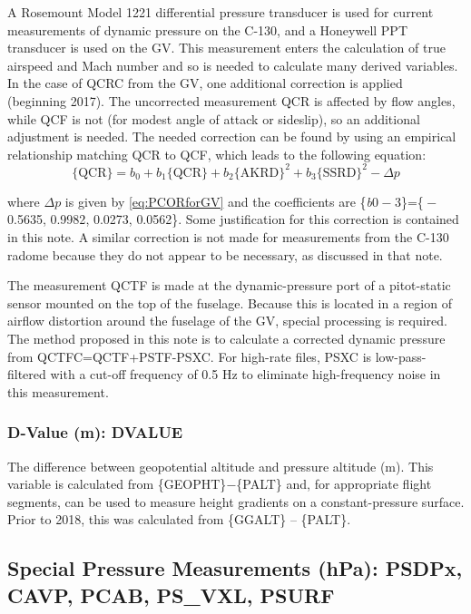 \documentclass[
]{book}
\begin{document}
A Rosemount Model 1221 differential pressure transducer is used for current measurements of dynamic pressure on the C-130, and a Honeywell PPT transducer is used on the GV. This measurement enters the calculation of true airspeed and Mach number and so is needed to calculate many derived variables.
In the case of QCRC from the GV, one additional correction is applied (beginning 2017). The uncorrected measurement QCR is affected by flow angles, while QCF is not (for modest angle of attack or sideslip), so an additional adjustment is needed. The needed correction can be found by using an empirical relationship matching QCR to QCF, which leads to the following equation:\\
\begin{equation}
\mathrm{\{QCR\}}=b_0+b_1\mathrm{\{QCR\}}+b_2\mathrm{\{AKRD\}}^2+b_3\mathrm{\{SSRD\}}^2-\Delta p
\label{eq:PCORforQCR}
\end{equation}

where \(\Delta p\) is given by \eqref{eq:PCORforGV} and the coefficients are \{{\emph{b}0 − 3}\}=\{{ − 0.5635}, {0.9982}, 0.0273, {0.0562}\}. Some justification for this correction is contained in this note. A similar correction is not made for measurements from the C-130 radome because they do not appear to be necessary, as discussed in that note.

The measurement QCTF is made at the dynamic-pressure port of a pitot-static sensor mounted on the top of the fuselage. Because this is located in a region of airflow distortion around the fuselage of the GV, special processing is required. The method proposed in this note is to calculate a corrected dynamic pressure from QCTFC=QCTF+PSTF-PSXC. For high-rate files, PSXC is low-pass-filtered with a cut-off frequency of 0.5 Hz to eliminate high-frequency noise in this measurement.

\hypertarget{dvalue}{%
\subsubsection*{D-Value (m): DVALUE}\label{dvalue}}

The difference between geopotential altitude and pressure altitude (m). This variable is calculated from \{GEOPHT\}{−}\{PALT\} and, for appropriate flight segments, can be used to measure height gradients on a constant-pressure surface. Prior to 2018, this was calculated from \{GGALT\} -- \{PALT\}.

\hypertarget{p-special}{%
\subsection*{Special Pressure Measurements (hPa): PSDPx, CAVP, PCAB, PS\_VXL, PSURF}\label{p-special}}
\end{document}
